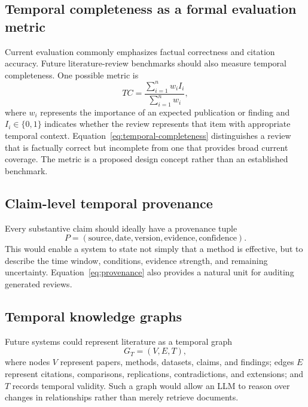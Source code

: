 \documentclass[manuscript,screen]{acmart}
\begin{document}
\subsection{Temporal completeness as a formal evaluation metric}\label{subsec:temporal-completeness}
Current evaluation commonly emphasizes factual correctness and citation accuracy. Future literature-review
benchmarks should also measure temporal completeness. One possible metric is
\begin{equation}
    TC = \frac{\sum_{i=1}^{n} w_i I_i}{\sum_{i=1}^{n} w_i},
    \label{eq:temporal-completeness}
\end{equation}
where $w_i$ represents the importance of an expected publication or finding and $I_i\in\{0,1\}$ indicates
whether the review represents that item with appropriate temporal context. Equation~\eqref{eq:temporal-completeness}
distinguishes a review that is factually correct but incomplete from one that provides broad current coverage.
The metric is a proposed design concept rather than an established benchmark.

\subsection{Claim-level temporal provenance}\label{subsec:provenance}
Every substantive claim should ideally have a provenance tuple
\begin{equation}
    P=(\text{source},\text{date},\text{version},\text{evidence},\text{confidence}).
    \label{eq:provenance}
\end{equation}
This would enable a system to state not simply that a method is effective, but to describe the time window,
conditions, evidence strength, and remaining uncertainty. Equation~\eqref{eq:provenance} also provides a
natural unit for auditing generated reviews.

\subsection{Temporal knowledge graphs}\label{subsec:knowledge-graphs}
Future systems could represent literature as a temporal graph
\begin{equation}
    G_T=(V,E,T),
    \label{eq:temporal-graph}
\end{equation}
where nodes $V$ represent papers, methods, datasets, claims, and findings; edges $E$ represent citations,
comparisons, replications, contradictions, and extensions; and $T$ records temporal validity. Such a graph
would allow an LLM to reason over changes in relationships rather than merely retrieve documents.
\end{document}
